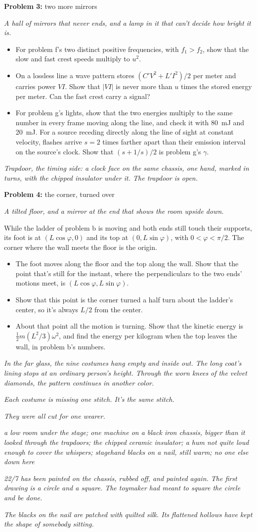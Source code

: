 \documentclass[11pt]{article}
\newcommand{\scene}[1]{\par{\itshape #1}\par}
\newcommand{\problem}[2]{\par\medskip\textbf{Problem #1:} #2\par\nopagebreak}
\newcommand{\appx}[2]{\clearpage{\Large\bfseries Appendix #1: #2}\par\medskip}
\newenvironment{parts}{\begin{itemize}[leftmargin=3.4em,labelwidth=2.8em,labelsep=0.6em,align=left,itemsep=2pt,topsep=3pt]}{\end{itemize}}
\newcommand{\pt}[1]{\item[\textbf{#1}]}
\begin{document}
\problem{3}{two more mirrors}
\scene{A hall of mirrors that never ends, and a lamp in it that can't decide how bright it is.}
\begin{parts}
\pt{3-$\alpha$} For problem f's two distinct positive frequencies, with $f_1 > f_2$, show that the slow and fast crest speeds multiply to $u^2$.
\pt{3-$\beta$} On a lossless line a wave pattern stores $(C'V^2 + L'I^2)/2$ per meter and carries power $VI$. Show that $|VI|$ is never more than $u$ times the stored energy per meter. Can the fast crest carry a signal?
\pt{3-$\gamma$} For problem g's lights, show that the two energies multiply to the same number in every frame moving along the line, and check it with \SI{80}{mJ} and \SI{20}{mJ}. For a source receding directly along the line of sight at constant velocity, flashes arrive $s = 2$ times farther apart than their emission interval on the source's clock. Show that $(s + 1/s)/2$ is problem g's $\gamma$.
\end{parts}
\scene{Trapdoor, the timing side: a clock face on the same chassis, one hand, marked in turns, with the chipped insulator under it. The trapdoor is open.}

\problem{4}{the corner, turned over}
\scene{A tilted floor, and a mirror at the end that shows the room upside down.}
While the ladder of problem b is moving and both ends still touch their supports, its foot is at $(L\cos\varphi, 0)$ and its top at $(0, L\sin\varphi)$, with $0 < \varphi < \pi/2$. The corner where the wall meets the floor is the origin.
\begin{parts}
\pt{4-$\alpha$} The foot moves along the floor and the top along the wall. Show that the point that's still for the instant, where the perpendiculars to the two ends' motions meet, is $(L\cos\varphi, L\sin\varphi)$.
\pt{4-$\beta$} Show that this point is the corner turned a half turn about the ladder's center, so it's always $L/2$ from the center.
\pt{4-$\gamma$} About that point all the motion is turning. Show that the kinetic energy is $\frac12 m(L^2/3)\omega^2$, and find the energy per kilogram when the top leaves the wall, in problem b's numbers.
\end{parts}
\scene{In the far glass, the nine costumes hang empty and inside out. The long coat's lining stops at an ordinary person's height. Through the worn knees of the velvet diamonds, the pattern continues in another color.}
\scene{Each costume is missing one stitch. It's the same stitch.}
\scene{They were all cut for one wearer.}

\appx{$\gamma$}{under the stage}
\scene{a low room under the stage; one machine on a black iron chassis, bigger than it looked through the trapdoors; the chipped ceramic insulator; a hum not quite loud enough to cover the whispers; stagehand blacks on a nail, still warm; no one else down here}
\scene{22/7 has been painted on the chassis, rubbed off, and painted again. The first drawing is a circle and a square. The toymaker had meant to square the circle and be done.}
\scene{The blacks on the nail are patched with quilted silk. Its flattened hollows have kept the shape of somebody sitting.}
\end{document}
